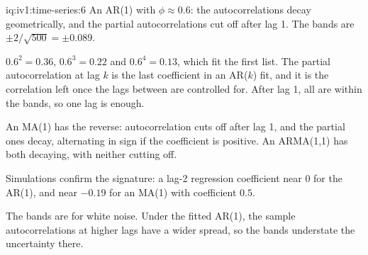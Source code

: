 \begin{solution}{iq:iv1:time-series:6}
An AR(1) with $\phi \approx 0.6$: the autocorrelations decay geometrically, and the partial autocorrelations cut off after lag 1. The bands are $\pm 2/\sqrt{500} = \pm 0.089$.

$0.6^2 = 0.36$, $0.6^3 = 0.22$ and $0.6^4 = 0.13$, which fit the first list. The partial autocorrelation at lag $k$ is the last coefficient in an AR($k$) fit, and it is the correlation left once the lags between are controlled for. After lag 1, all are within the bands, so one lag is enough.

An MA(1) has the reverse: autocorrelation cuts off after lag 1, and the partial ones decay, alternating in sign if the coefficient is positive. An ARMA(1,1) has both decaying, with neither cutting off.

Simulations confirm the signature: a lag-2 regression coefficient near 0 for the AR(1), and near $-0.19$ for an MA(1) with coefficient $0.5$.

The bands are for white noise. Under the fitted AR(1), the sample autocorrelations at higher lags have a wider spread, so the bands understate the uncertainty there.



\end{solution}


